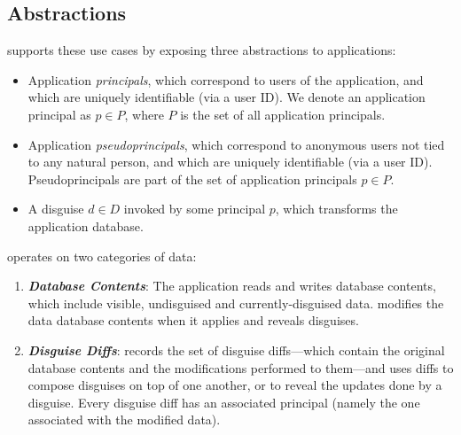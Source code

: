 \subsection{\sys Abstractions}
\sys supports these use cases by exposing three abstractions to applications:
\begin{itemize}
    \item Application \emph{principals}, which correspond to users of the application, 
	and which are uniquely identifiable (\eg via a user ID).
	We denote an application principal as $p \in P$, where $P$ is the set of all application principals.
    \item Application \emph{pseudoprincipals}, which correspond to anonymous users not tied to any natural
    person, and which are uniquely identifiable (\eg via a user ID).
	Pseudoprincipals are part of the set of application principals $p \in P$.
    \item A disguise $d \in D$ invoked by some principal $p$, which 
        transforms the application database.
\end{itemize}
%
%
\sys operates on two categories of data:
\begin{enumerate}
    \item \emph{\textbf{Database Contents}}: The application reads and writes database
        contents, which include visible, undisguised and currently-disguised data.
        \sys modifies the data database contents when it applies and reveals disguises.
    \item \emph{\textbf{Disguise Diffs}}: \sys records the set of disguise diffs---which contain the
        original database contents and the modifications performed to them---and uses diffs to
        compose disguises on top of one another, or to reveal the updates done by a disguise.
        Every disguise diff has an associated principal (namely the one associated with the modified data).
\end{enumerate}

